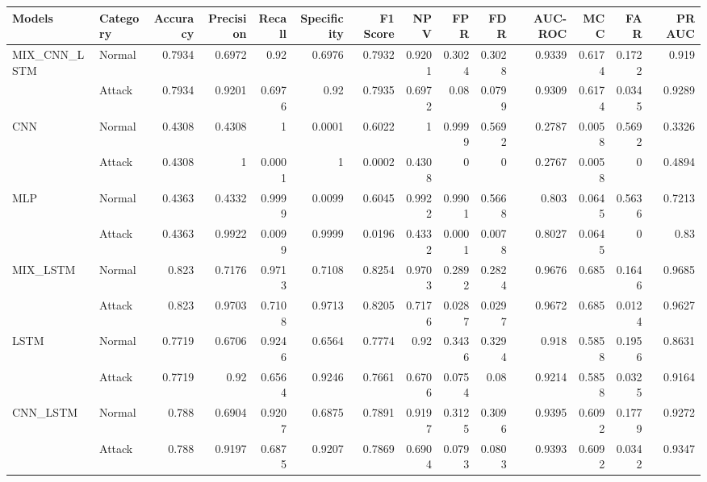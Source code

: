 \begin{tabular}{llrrrrrrrrrrrr}
\hline
 Models         & Category   &   Accuracy &   Precision &   Recall &   Specificity &   F1 Score &    NPV &    FPR &    FDR &   AUC-ROC &    MCC &    FAR &   PR AUC \\
\hline
 MIX\_CNN\_LSTM & Normal     &     0.7934 &      0.6972 &   0.92   &        0.6976 &     0.7932 & 0.9201 & 0.3024 & 0.3028 &    0.9339 & 0.6174 & 0.1722 &   0.919  \\
                & Attack     &     0.7934 &      0.9201 &   0.6976 &        0.92   &     0.7935 & 0.6972 & 0.08   & 0.0799 &    0.9309 & 0.6174 & 0.0345 &   0.9289 \\
 CNN            & Normal     &     0.4308 &      0.4308 &   1      &        0.0001 &     0.6022 & 1      & 0.9999 & 0.5692 &    0.2787 & 0.0058 & 0.5692 &   0.3326 \\
                & Attack     &     0.4308 &      1      &   0.0001 &        1      &     0.0002 & 0.4308 & 0      & 0      &    0.2767 & 0.0058 & 0      &   0.4894 \\
 MLP            & Normal     &     0.4363 &      0.4332 &   0.9999 &        0.0099 &     0.6045 & 0.9922 & 0.9901 & 0.5668 &    0.803  & 0.0645 & 0.5636 &   0.7213 \\
                & Attack     &     0.4363 &      0.9922 &   0.0099 &        0.9999 &     0.0196 & 0.4332 & 0.0001 & 0.0078 &    0.8027 & 0.0645 & 0      &   0.83   \\
 MIX\_LSTM      & Normal     &     0.823  &      0.7176 &   0.9713 &        0.7108 &     0.8254 & 0.9703 & 0.2892 & 0.2824 &    0.9676 & 0.685  & 0.1646 &   0.9685 \\
                & Attack     &     0.823  &      0.9703 &   0.7108 &        0.9713 &     0.8205 & 0.7176 & 0.0287 & 0.0297 &    0.9672 & 0.685  & 0.0124 &   0.9627 \\
 LSTM           & Normal     &     0.7719 &      0.6706 &   0.9246 &        0.6564 &     0.7774 & 0.92   & 0.3436 & 0.3294 &    0.918  & 0.5858 & 0.1956 &   0.8631 \\
                & Attack     &     0.7719 &      0.92   &   0.6564 &        0.9246 &     0.7661 & 0.6706 & 0.0754 & 0.08   &    0.9214 & 0.5858 & 0.0325 &   0.9164 \\
 CNN\_LSTM      & Normal     &     0.788  &      0.6904 &   0.9207 &        0.6875 &     0.7891 & 0.9197 & 0.3125 & 0.3096 &    0.9395 & 0.6092 & 0.1779 &   0.9272 \\
                & Attack     &     0.788  &      0.9197 &   0.6875 &        0.9207 &     0.7869 & 0.6904 & 0.0793 & 0.0803 &    0.9393 & 0.6092 & 0.0342 &   0.9347 \\
\hline
\end{tabular}
